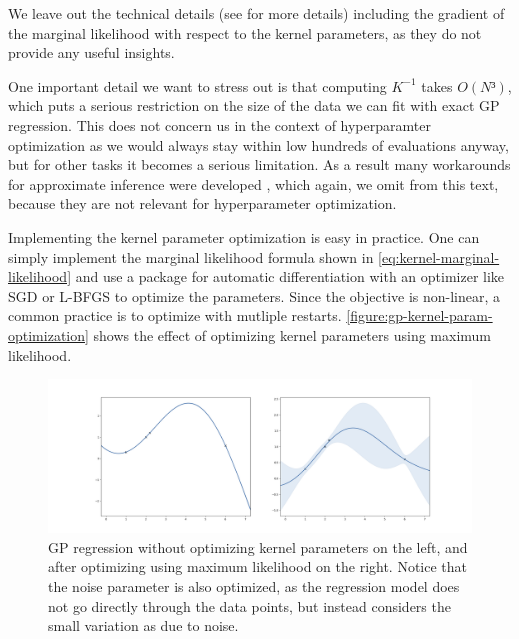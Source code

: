 We leave out the technical details (see \cite{williams2006gaussian} for more
details) including the gradient of the marginal likelihood with respect to the
kernel parameters, as they do not provide any useful insights.

One important detail we want to stress out is that computing $K^{-1}$ takes
$O(N³)$, which puts a serious restriction on the size of the data we can fit
with exact GP regression. This does not concern us in the context of
hyperparamter optimization as we would always stay within low hundreds of
evaluations anyway, but for other tasks it becomes a serious limitation. As a
result many workarounds for approximate inference were developed
\citep{williams2006gaussian}, which again, we omit from this text, because they
are not relevant for hyperparameter optimization.

Implementing the kernel parameter optimization is easy in practice. One can
simply implement the marginal likelihood formula shown in
\autoref{eq:kernel-marginal-likelihood}  and
use a package for automatic differentiation with an optimizer like SGD or
L-BFGS to optimize the parameters. Since the objective is non-linear, a common
practice \citep{gpy2014} is to optimize with mutliple restarts.
\autoref{figure:gp-kernel-param-optimization} shows the effect of optimizing
kernel parameters using maximum likelihood.

\begin{figure}
  \begin{center}
    \includegraphics[width=1.0\textwidth]{images/gp-kernel-param-optimization.png}
    \caption{GP regression without optimizing kernel parameters on the left,
      and after optimizing using maximum likelihood on the right. Notice that
      the noise parameter is also optimized, as the regression model does not
      go directly through the data points, but instead considers the small
      variation as due to noise.}
  \end{center}
\end{figure}
\label{figure:gp-kernel-param-optimization}


